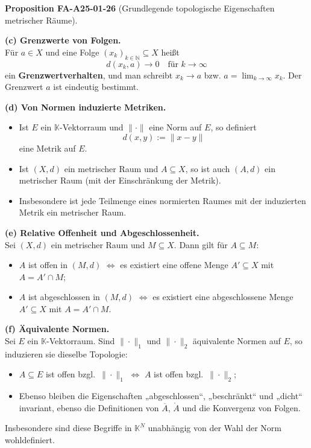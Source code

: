 \documentclass[10pt, letterpaper]{article}
\newcommand{\CustomHeading}[3]{%
  \par\medskip\noindent%
  \textbf{#1 #2} \textnormal{(#3)}.\enskip%
}
\newenvironment{PROP}[2]{\begin{unitbox}\CustomHeading{Proposition}{#1}{#2}}{\end{unitbox}}
\begin{document}
\begin{PROP}{FA-A25-01-26}{Grundlegende topologische Eigenschaften metrischer Räume}
\textbf{(c) Grenzwerte von Folgen.}\\
Für $a\in X$ und eine Folge $(x_k)_{k\in\mathbb{N}}\subseteq X$ heißt
\[
d(x_k,a)\to 0\quad\text{für }k\to\infty
\]
ein \textbf{Grenzwertverhalten}, und man schreibt $x_k\to a$ bzw. $a=\lim_{k\to\infty}x_k$.
Der Grenzwert $a$ ist eindeutig bestimmt.

\textbf{(d) Von Normen induzierte Metriken.}
\begin{itemize}
  \item Ist $E$ ein $\mathbb{K}$-Vektorraum und $\|\cdot\|$ eine Norm auf $E$, so definiert
        \[
        d(x,y):=\|x-y\|
        \]
        eine Metrik auf $E$.
  \item Ist $(X,d)$ ein metrischer Raum und $A\subseteq X$, so ist auch $(A,d)$ ein metrischer Raum (mit der Einschränkung der Metrik).
  \item Insbesondere ist jede Teilmenge eines normierten Raumes mit der induzierten Metrik ein metrischer Raum.
\end{itemize}

\textbf{(e) Relative Offenheit und Abgeschlossenheit.}\\
Sei $(X,d)$ ein metrischer Raum und $M\subseteq X$. Dann gilt für $A\subseteq M$:
\begin{itemize}
  \item $A$ ist offen in $(M,d)$ $\Longleftrightarrow$ es existiert eine offene Menge $A'\subseteq X$ mit $A=A'\cap M$;
  \item $A$ ist abgeschlossen in $(M,d)$ $\Longleftrightarrow$ es existiert eine abgeschlossene Menge $A'\subseteq X$ mit $A=A'\cap M$.
\end{itemize}

\textbf{(f) Äquivalente Normen.}\\
Sei $E$ ein $\mathbb{K}$-Vektorraum.  
Sind $\|\cdot\|_1$ und $\|\cdot\|_2$ äquivalente Normen auf $E$, so induzieren sie dieselbe Topologie:
\begin{itemize}
  \item $A\subseteq E$ ist offen bzgl.\ $\|\cdot\|_1$ $\Longleftrightarrow$ $A$ ist offen bzgl.\ $\|\cdot\|_2$;
  \item Ebenso bleiben die Eigenschaften „abgeschlossen“, „beschränkt“ und „dicht“ invariant, ebenso die Definitionen von $\overline{A}$, $\mathring{A}$ und die Konvergenz von Folgen.
\end{itemize}
Insbesondere sind diese Begriffe in $\mathbb{K}^N$ unabhängig von der Wahl der Norm wohldefiniert.
\end{PROP}
\end{document}
